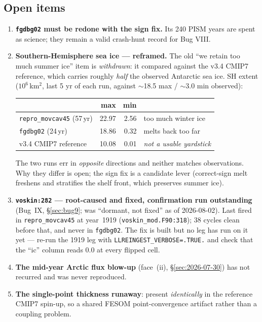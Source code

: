 \documentclass[11pt,a4paper]{article}
\newcommand{\code}[1]{\texttt{\small #1}}
\begin{document}
\subsection{Open items}\label{sec:seaicemelt}
\begin{enumerate}
\item \textbf{\code{fgdbg02} must be redone with the sign fix.} Its 240 PISM years are spent as
  science; they remain a valid crash-hunt record for Bug VIII.
\item \textbf{Southern-Hemisphere sea ice --- reframed.} The old ``we retain too much summer ice''
  item is \emph{withdrawn}: it compared against the v3.4 CMIP7 reference, which carries roughly
  \emph{half} the observed Antarctic sea ice. SH extent ($10^6$\,km$^2$, last 5 yr of each run,
  against $\sim$18.5 max / $\sim$3.0 min observed):

  \begin{center}\small
  \begin{tabular}{@{}lrrl@{}}
  \toprule
   & max & min & \\
  \midrule
  \code{repro\_movcav45} (57\,yr) & 22.97 & 2.56 & too much winter ice \\
  \code{fgdbg02} (24\,yr)         & 18.86 & 0.32 & melts back too far \\
  v3.4 CMIP7 reference            & 10.08 & 0.01 & \emph{not a usable yardstick} \\
  \bottomrule
  \end{tabular}
  \end{center}

  The two runs err in \emph{opposite} directions and neither matches observations. Why they differ
  is open; the sign fix is a candidate lever (correct-sign melt freshens and stratifies the shelf
  front, which preserves summer ice).
\item \textbf{\code{voskin:282} --- root-caused and fixed, confirmation run outstanding} (Bug~IX,
  \S\ref{sec:bug9}; was ``dormant, not fixed'' as of 2026-08-02). Last fired in
  \code{repro\_movcav45} at year~1919 (\code{voskin\_mod.F90:318}); 38 cycles clean before that, and
  never in \code{fgdbg02}. The fix is built but no leg has run on it yet --- re-run the 1919 leg with
  \code{LLREINGEST\_VERBOSE=.TRUE.} and check that the ``ic'' column reads 0.0 at every flipped cell.
\item \textbf{The mid-year Arctic flux blow-up} (face~(ii), \S\ref{sec:2026-07-30}) has not
  recurred and was never reproduced.
\item \textbf{The single-point thickness runaway}: present \emph{identically} in the reference
  CMIP7 spin-up, so a shared FESOM point-convergence artifact rather than a coupling problem.
\end{enumerate}
\end{document}
